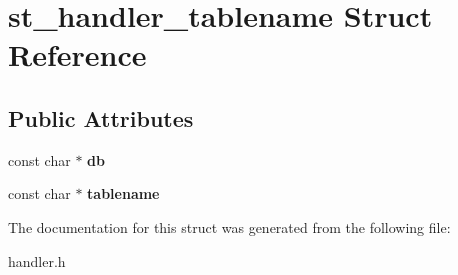 \hypertarget{structst__handler__tablename}{}\section{st\+\_\+handler\+\_\+tablename Struct Reference}
\label{structst__handler__tablename}
\subsection*{Public Attributes}
\begin{DoxyCompactItemize}
\item 
\mbox{\label{structst__handler__tablename_a97c029dd99dd034c8979a24de0bde135}} 
const char $\ast$ {\bfseries db}
\item 
\mbox{\label{structst__handler__tablename_ae80d090433add9b5be6747aa6e1a11aa}} 
const char $\ast$ {\bfseries tablename}
\end{DoxyCompactItemize}


The documentation for this struct was generated from the following file\+:\begin{DoxyCompactItemize}
\item 
handler.\+h\end{DoxyCompactItemize}
